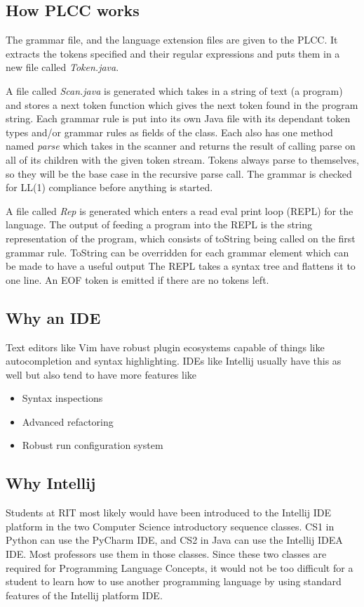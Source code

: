 \documentclass[conference, letterpaper]{IEEEtran}
\begin{document}
\subsection{How PLCC works}\label{subsec:how-plcc-works}
The grammar file, and the language extension files are given to the PLCC\@.
It extracts the tokens specified and their regular expressions and puts them in a new file called \textit{Token.java}.

A file called \textit{Scan.java} is generated which takes in a string of text (a program) and stores a next token function which gives the next token found in the program string.
Each grammar rule is put into its own Java file with its dependant token types and/or grammar rules as fields of the class.
Each also has one method named \textit{parse} which takes in the scanner and returns the result of calling parse on all of its children with the given token stream.
Tokens always parse to themselves, so they will be the base case in the recursive parse call.
The grammar is checked for LL(1) compliance before anything is started.

A file called \textit{Rep} is generated which enters a read eval print loop (REPL) for the language.
The output of feeding a program into the REPL is the string representation of the program, which consists of toString being called on the first grammar rule.
ToString can be overridden for each grammar element which can be made to have a useful output
The REPL takes a syntax tree and flattens it to one line.
An EOF token is emitted if there are no tokens left.



\subsection{Why an IDE}\label{subsec:why-an-ide}
Text editors like Vim have robust plugin ecosystems capable of things like autocompletion and syntax highlighting.
IDEs like Intellij usually have this as well but also tend to have more features like
\begin{itemize}
    \item Syntax inspections
    \item Advanced refactoring
    \item Robust run configuration system
\end{itemize}

\subsection{Why Intellij}\label{subsec:why-intellij}
Students at RIT most likely would have been introduced to the Intellij IDE platform in the two Computer Science introductory sequence classes.
CS1 in Python can use the PyCharm IDE, and CS2 in Java can use the Intellij IDEA IDE.
Most professors use them in those classes.
Since these two classes are required for Programming Language Concepts, it would not be too difficult for a student to learn how to use another programming language by using standard features of the Intellij platform IDE\@.
\end{document}
